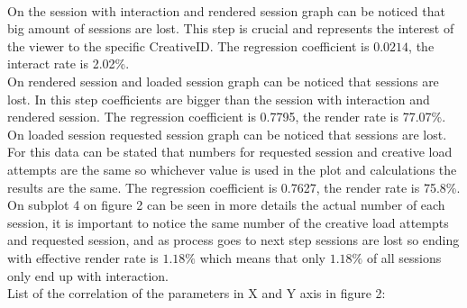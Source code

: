 \documentclass[fleqn,moreauthors,10pt]{ds_report}
\begin{document}
\\On the session with interaction and rendered session graph can be noticed that big amount of sessions are lost. This step is crucial and represents the interest of the viewer to the specific CreativeID.  The regression coefficient is $0.0214$, the interact rate is 2.02\%.
\\On rendered session  and loaded session graph can be noticed that sessions are lost. In this step coefficients are bigger than the session with interaction and rendered session.  The regression coefficient is 0.7795, the render rate is 77.07\%.
\\On loaded session requested session graph can be noticed that sessions are lost. For this data can be stated that numbers for requested session and creative load attempts are the same so whichever value is used in the plot and calculations the results are the same.  The regression coefficient is 0.7627, the render rate is 75.8\%.
\\On subplot 4 on figure 2 can be seen in more details the actual number of each session, it is important to notice the same number of the creative load attempts and requested session, and as process goes to next step sessions are lost so ending with effective render rate is $1.18\% $ which means that only $1.18\%$ of all sessions only end up with interaction.  
\\List of the correlation of the parameters in X and Y axis in figure 2:
	
\end{document}
